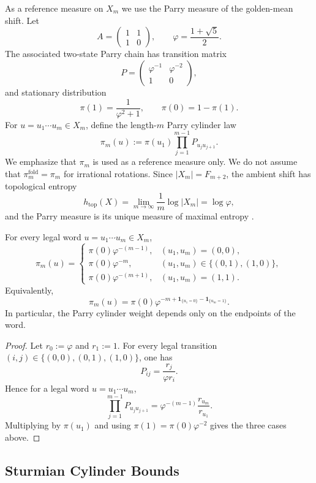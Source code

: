 As a reference measure on \(X_m\) we use the Parry measure of the golden-mean
shift. Let
\[
A=\begin{pmatrix}1&1\\1&0\end{pmatrix},\qquad
\varphi=\frac{1+\sqrt5}{2}.
\]
The associated two-state Parry chain has transition matrix
\[
P=\begin{pmatrix}\varphi^{-1} & \varphi^{-2}\\ 1&0\end{pmatrix},
\]
and stationary distribution
\[
\pi(1)=\frac{1}{\varphi^2+1},\qquad
\pi(0)=1-\pi(1).
\]
For $u=u_1\cdots u_m\in X_m$, define the length-$m$ Parry cylinder law
\[
\pi_m(u):=\pi(u_1)\prod_{j=1}^{m-1}P_{u_j u_{j+1}}.
\]
We emphasize that \(\pi_m\) is used as a reference measure only. We do not
assume that \(\pi_m^{\mathrm{fold}}=\pi_m\) for irrational rotations.
Since \(|X_m|=F_{m+2}\), the ambient shift has topological entropy
\[
h_{\mathrm{top}}(X)=\lim_{m\to\infty}\frac1m\log |X_m|=\log\varphi,
\]
and the Parry measure is its unique measure of maximal entropy
\cite{LindMarcus1995,WaltersErgodicTheory}.

\begin{proposition}\label{prop:parry-endpoint-collapse}
For every legal word \(u=u_1\cdots u_m\in X_m\),
\[
\pi_m(u)=
\begin{cases}
\pi(0)\varphi^{-(m-1)}, & (u_1,u_m)=(0,0),\\
\pi(0)\varphi^{-m}, & (u_1,u_m)\in\{(0,1),(1,0)\},\\
\pi(0)\varphi^{-(m+1)}, & (u_1,u_m)=(1,1).
\end{cases}
\]
Equivalently,
\[
\pi_m(u)
=
\pi(0)\varphi^{-m+\mathbf{1}_{\{u_1=0\}}-\mathbf{1}_{\{u_m=1\}}}.
\]
In particular, the Parry cylinder weight depends only on the endpoints of the
word.
\end{proposition}

\begin{proof}
Let \(r_0:=\varphi\) and \(r_1:=1\). For every legal transition
\((i,j)\in\{(0,0),(0,1),(1,0)\}\), one has
\[
P_{ij}=\frac{r_j}{\varphi r_i}.
\]
Hence for a legal word \(u=u_1\cdots u_m\),
\[
\prod_{j=1}^{m-1}P_{u_j u_{j+1}}
=
\varphi^{-(m-1)}\frac{r_{u_m}}{r_{u_1}}.
\]
Multiplying by \(\pi(u_1)\) and using \(\pi(1)=\pi(0)\varphi^{-2}\) gives the
three cases above.
\end{proof}

\subsection{Sturmian Cylinder Bounds}

